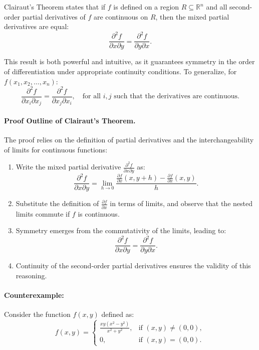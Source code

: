\noindent Clairaut's Theorem states that if \( f \) is defined on a region \( R \subseteq \mathbb{R}^n \) and all second-order partial derivatives of \( f \) are continuous on \( R \), then the mixed partial derivatives are equal:
\[
\frac{\partial^2 f}{\partial x \partial y} = \frac{\partial^2 f}{\partial y \partial x}.
\]

\noindent This result is both powerful and intuitive, as it guarantees symmetry in the order of differentiation under appropriate continuity conditions. To generalize, for \( f(x_1, x_2, \ldots, x_n) \):
\[
\frac{\partial^2 f}{\partial x_i \partial x_j} = \frac{\partial^2 f}{\partial x_j \partial x_i}, \quad \text{for all } i, j \text{ such that the derivatives are continuous.}
\]

\paragraph{Proof Outline of Clairaut's Theorem.}
The proof relies on the definition of partial derivatives and the interchangeability of limits for continuous functions:
\begin{enumerate}
    \item Write the mixed partial derivative \( \frac{\partial^2 f}{\partial x \partial y} \) as:
    \[
    \frac{\partial^2 f}{\partial x \partial y} = \lim_{h \to 0} \frac{\frac{\partial f}{\partial x}(x, y + h) - \frac{\partial f}{\partial x}(x, y)}{h}.
    \]
    \item Substitute the definition of \( \frac{\partial f}{\partial x} \) in terms of limits, and observe that the nested limits commute if \( f \) is continuous.
    \item Symmetry emerges from the commutativity of the limits, leading to:
    \[
    \frac{\partial^2 f}{\partial x \partial y} = \frac{\partial^2 f}{\partial y \partial x}.
    \]
    \item Continuity of the second-order partial derivatives ensures the validity of this reasoning.
\end{enumerate}

\paragraph{Counterexample:}
Consider the function \( f(x, y) \) defined as:
\[
f(x, y) = 
\begin{cases} 
\frac{xy(x^2 - y^2)}{x^2 + y^2}, & \text{if } (x, y) \neq (0, 0), \\
0, & \text{if } (x, y) = (0, 0).
\end{cases}
\]

